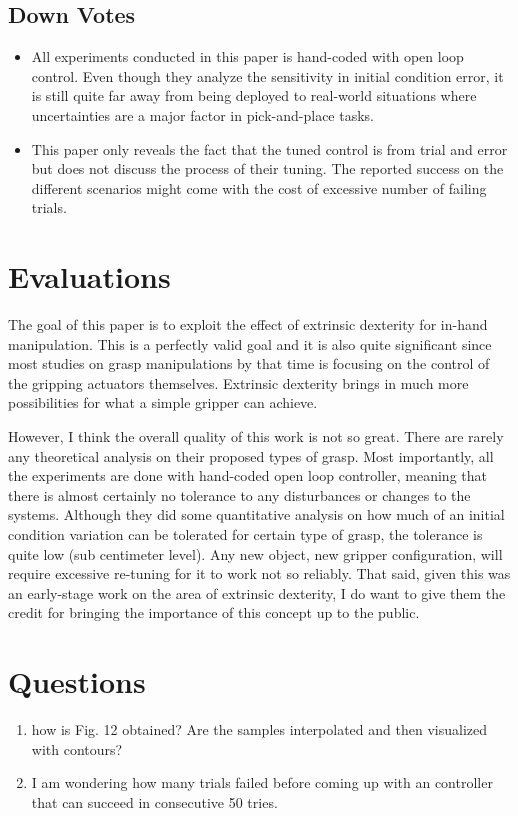 \documentclass[10pt, twocolumn]{article}
\begin{document}
\subsection{Down Votes}
\begin{itemize}
  \item All experiments conducted in this paper is hand-coded with open loop
    control. Even though they analyze the sensitivity in initial condition
    error, it is still quite far away from being deployed to real-world situations
    where uncertainties are a major factor in pick-and-place tasks.
  \item This paper only reveals the fact that the tuned control is from trial
    and error but does not discuss the process of their tuning. The reported
    success on the different scenarios might come with the cost of excessive
    number of failing trials.
\end{itemize}

\section{Evaluations}

The goal of this paper is to exploit the effect of extrinsic dexterity for
in-hand manipulation. This is a perfectly valid goal and it is also quite significant
since most studies on grasp manipulations by that time is focusing on the control
of the gripping actuators themselves. Extrinsic dexterity brings in much more
possibilities for what a simple gripper can achieve.

However, I think the overall quality of this work is not so great. There are
rarely any theoretical analysis on their proposed types of grasp. Most importantly,
all the experiments are done with hand-coded open loop controller, meaning that
there is almost certainly no tolerance to any disturbances or changes to the systems.
Although they did some quantitative analysis on how much of an initial condition
variation can be tolerated for certain type of grasp, the tolerance is quite low
(sub centimeter level). Any new object, new gripper configuration, will require
excessive re-tuning for it to work not so reliably. That said, given this was an
early-stage work on the area of extrinsic dexterity, I do want to give them the
credit for bringing the importance of this concept up to the public.

\section{Questions}
\begin{enumerate}
  \item how is Fig. 12 obtained? Are the samples interpolated and then visualized
    with contours?
  \item I am wondering how many trials failed before coming up with an controller
    that can succeed in consecutive 50 tries.
\end{enumerate}
\end{document}
